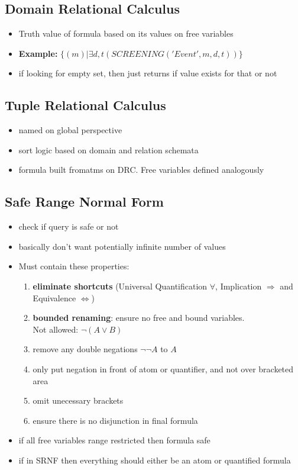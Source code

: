 \documentclass{article}
\newcommand\tab[1][0.5cm]{\hspace*{#1}}
\begin{document}
	\subsection{Domain Relational Calculus}
		\begin{itemize}
			\item Truth value of formula based on its values on free variables
			\item \textbf{Example:} $\{ (m) | \exists d, t(SCREENING ('Event', m, d, t)) \}$
			\item if looking for empty set, then just returns if value exists for that or not
		\end{itemize}

	\subsection{Tuple Relational Calculus}
		\begin{itemize}
			\item named on global perspective
			\item sort logic based on domain and relation schemata
			\item formula built fromatms on DRC. Free variables defined analogously
		\end{itemize}

	\subsection{Safe Range Normal Form}
		\begin{itemize}
			\item check if query is safe or not
			\item basically don't want potentially infinite number of values

			\item Must contain these properties:
				\begin{enumerate}
					\item \textbf{eliminate shortcuts} (Universal Quantification $\forall$, Implication $\Rightarrow$ and Equivalence $\Leftrightarrow$)
					\item \textbf{bounded renaming}: ensure no free and bound variables.\\ \tab Not allowed: $\neg (A \vee B)$
					\item remove any double negations $\neg \neg A$ to $A$
					\item only put negation in front of atom or quantifier, and not over bracketed area
					\item omit unecessary brackets
					\item ensure there is no disjunction in final formula
				\end{enumerate}

			\item if all free variables range restricted then formula safe
			\item if in SRNF then everything should either be an atom or quantified formula
		\end{itemize}
\end{document}
